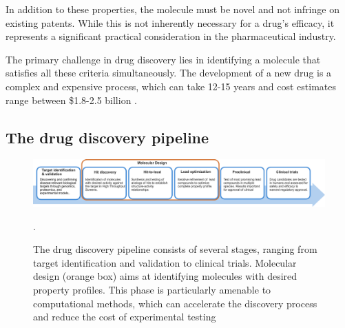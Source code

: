 In addition to these properties, the molecule must be novel and not infringe on existing patents.
While this is not inherently necessary for a drug's efficacy, it represents a significant practical
consideration in the pharmaceutical industry.

The primary challenge in drug discovery lies in identifying a molecule that satisfies all these
criteria simultaneously. The development of a new drug is a complex and expensive process, which can
take 12-15 years and cost estimates range between \$1.8-2.5 billion \citep{hughesPrinciplesEarlyDrug2011,paulHowImproveProductivity2010,dimasiInnovationPharmaceuticalIndustry2016}.

\subsection{The drug discovery pipeline}
\begin{figure}
    \centering
    \includegraphics[width=\textwidth]{figures/drug-discovery-pipeline_v2.pdf}
    \caption{The drug discovery pipeline consists of several stages, ranging from target identification
        and validation to clinical trials. Molecular design (orange box) aims at identifying
        molecules with desired property profiles. This phase is particularly amenable to
        computational methods, which can accelerate the discovery process and reduce the cost of
        experimental testing\label{fig:drug-discovery-pipeline}}.
\end{figure}

